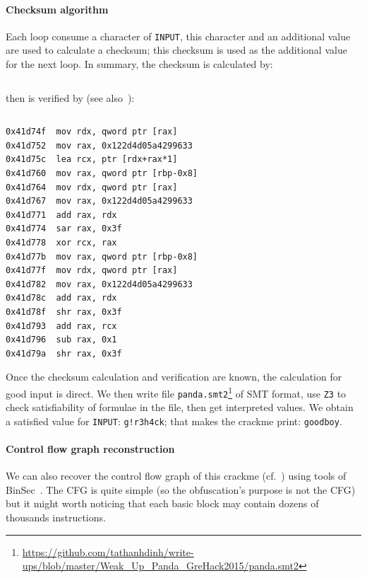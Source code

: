 \documentclass{easychair}
\begin{document}
\paragraph{Checksum algorithm}
Each loop consume a character of \texttt{INPUT}, this character and an additional value are used to calculate a checksum; this checksum is used as the additional value for the next loop. In summary, the checksum is calculated by:
\begin{lstlisting}[frame=lines, caption={Calculating checksum}, captionpos=b, boxpos=b, language={[x86masm]Assembler}, label=lst:checksumcalculation]
\end{lstlisting}
then is verified by (see also~):
\begin{lstlisting}[frame=lines, caption={Verifying checksum}, captionpos=b, boxpos=b, language={[x86masm]Assembler}, label=lst:checksumverification]
\end{lstlisting}

\begin{lstlisting}[frame=lines, caption={Instructions verifying checksum}, captionpos=b, boxpos=b, language={[x86masm]Assembler}, label=lst:checksumverificationcode]
0x41d74f  mov rdx, qword ptr [rax]
0x41d752  mov rax, 0x122d4d05a4299633
0x41d75c  lea rcx, ptr [rdx+rax*1]
0x41d760  mov rax, qword ptr [rbp-0x8]
0x41d764  mov rdx, qword ptr [rax]
0x41d767  mov rax, 0x122d4d05a4299633
0x41d771  add rax, rdx
0x41d774  sar rax, 0x3f
0x41d778  xor rcx, rax
0x41d77b  mov rax, qword ptr [rbp-0x8]
0x41d77f  mov rdx, qword ptr [rax]
0x41d782  mov rax, 0x122d4d05a4299633
0x41d78c  add rax, rdx
0x41d78f  shr rax, 0x3f
0x41d793  add rax, rcx
0x41d796  sub rax, 0x1
0x41d79a  shr rax, 0x3f
\end{lstlisting}

Once the checksum calculation and verification are known, the calculation for good input is direct. We then write file \texttt{panda.smt2}\footnote{\url{https://github.com/tathanhdinh/write-ups/blob/master/Weak\_Up\_Panda\_GreHack2015/panda.smt2}} of SMT format, use \texttt{Z3} to check satisfiability of formulae in the file, then get interpreted values. We obtain a satisfied value for \texttt{INPUT}: \texttt{g!r3h4ck}; that makes the crackme print: \texttt{goodboy}.

\paragraph{Control flow graph reconstruction}
We can also recover the control flow graph of this crackme (cf.~) using tools of BinSec~\autocite{binsec}. The CFG is quite simple (so the obfuscation's purpose is not the CFG) but it might worth noticing that each basic block may contain dozens of thousands instructions.
\end{document}
